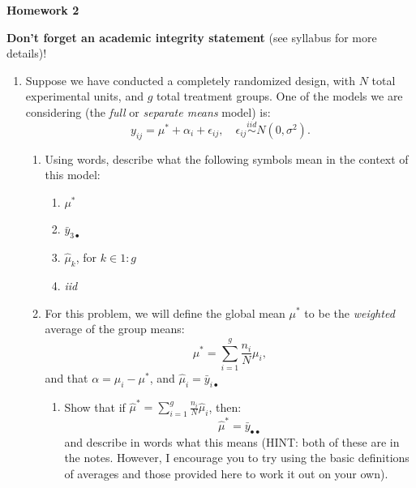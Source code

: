 \documentclass[10pt,twoside]{article}\usepackage[]{graphicx}\usepackage[dvipsnames,svgnames,table]{xcolor}
\begin{document}
\begin{flushright}
\begin{minipage}{.33\textwidth}
\rightline{\today}
\end{minipage}
\end{flushright}

\begin{center}
{\large{\textbf{Homework 2}}}
\end{center}

\textbf{Don't forget an academic integrity statement} (see syllabus for more details)!

\begin{enumerate}

  \item Suppose we have conducted a completely randomized design, with $N$ total experimental units, and $g$ total treatment groups. One of the models we are considering (the \emph{full} or \emph{separate means} model) is:
  $$
  y_{ij} = \mu^* + \alpha_i + \epsilon_{ij}, \quad \epsilon_{ij} \overset{iid}{\sim} N(0, \sigma^2).
  $$
  
  \begin{enumerate}
    \item Using words, describe what the following symbols mean in the context of this model:
    \begin{enumerate}
      \item $\mu^*$
      \vspace{12mm}
      \item $\bar{y}_{3 \bullet}$ 
      \vspace{12mm}
      \item $\hat{\mu}_{k}$, for $k \in 1:g$
      \vspace{12mm}
      \item \emph{iid}
      \vspace{12mm}
    \end{enumerate}
    
    \item For this problem, we will define the global mean $\mu^*$ to be the \emph{weighted} average of the group means:
  $$
  \mu^* = \sum_{i = 1}^g \frac{n_i}{N} \mu_i,
  $$
  and that $\alpha = \mu_i - \mu^*$, and $\hat{\mu}_i = \bar{y}_{i \bullet}$
  
  \begin{enumerate}
    \item Show that if $\hat{\mu}^* = \sum_{i = 1}^g \frac{n_i}{N}\hat{\mu}_i$, then:
    $$
    \hat{\mu}^* = \bar{y}_{\bullet \bullet}
    $$
    and describe in words what this means (HINT: both of these are in the notes. However, I encourage you to try using the basic definitions of averages and those provided here to work it out on your own). 
    

\end{enumerate}
\end{enumerate}
\end{enumerate}
\end{document}
